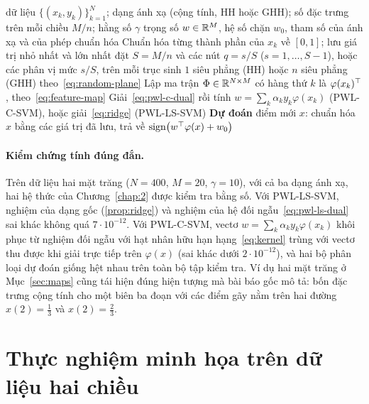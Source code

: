 \begin{algorithm}[t]
\caption{Huấn luyện và dự đoán với PWL-SVM}\label{alg:pwlsvm}
\begin{algorithmic}[1]
\Require dữ liệu $\{(x_k,y_k)\}_{k=1}^{N}$; dạng ánh xạ (cộng tính, HH hoặc GHH); số đặc trưng trên mỗi chiều $M/n$; hằng số $\gamma$
\Ensure trọng số $w\in\mathbb{R}^M$, hệ số chặn $w_0$, tham số của ánh xạ và của phép chuẩn hóa
\State Chuẩn hóa từng thành phần của $x_k$ về $[0,1]$; lưu giá trị nhỏ nhất và lớn nhất
  \State đặt $S=M/n$ và các nút $q=s/S$ ($s=1,\dots,S-1$), hoặc các phân vị mức $s/S$, trên mỗi trục
\Else
    \State sinh $1$ siêu phẳng (HH) hoặc $n$ siêu phẳng (GHH) theo~\eqref{eq:random-plane}
  \EndFor
\EndIf
\State Lập ma trận $\Phi\in\mathbb{R}^{N\times M}$ có hàng thứ $k$ là $\varphi(x_k)^\top$, theo~\eqref{eq:feature-map}
\State Giải~\eqref{eq:pwl-c-dual} rồi tính $w=\sum_k\alpha_ky_k\varphi(x_k)$ (PWL-C-SVM), hoặc giải~\eqref{eq:ridge} (PWL-LS-SVM)
\State \textbf{Dự đoán} điểm mới $x$: chuẩn hóa $x$ bằng các giá trị đã lưu, trả về $\operatorname{sign}\bigl(w^\top\varphi(x)+w_0\bigr)$
\end{algorithmic}
\end{algorithm}

\paragraph{Kiểm chứng tính đúng đắn.} Trên dữ liệu hai mặt trăng ($N=400$, $M=20$, $\gamma=10$), với cả ba dạng ánh xạ, hai hệ thức của Chương~\ref{chap:2} được kiểm tra bằng số. Với PWL-LS-SVM, nghiệm của dạng gốc (\cref{prop:ridge}) và nghiệm của hệ đối ngẫu~\eqref{eq:pwl-ls-dual} sai khác không quá $7\cdot10^{-12}$. Với PWL-C-SVM, vectơ $w=\sum_k\alpha_ky_k\varphi(x_k)$ khôi phục từ nghiệm đối ngẫu với hạt nhân hữu hạn hạng~\eqref{eq:kernel} trùng với vectơ thu được khi giải trực tiếp trên $\varphi(x)$ (sai khác dưới $2\cdot10^{-12}$), và hai bộ phân loại dự đoán giống hệt nhau trên toàn bộ tập kiểm tra. Ví dụ hai mặt trăng ở Mục~\ref{sec:maps} cũng tái hiện đúng hiện tượng mà bài báo gốc mô tả: bốn đặc trưng cộng tính cho một biên ba đoạn với các điểm gãy nằm trên hai đường $x(2)=\tfrac13$ và $x(2)=\tfrac23$.

\section{Thực nghiệm minh họa trên dữ liệu hai chiều}\label{sec:exp2d}

